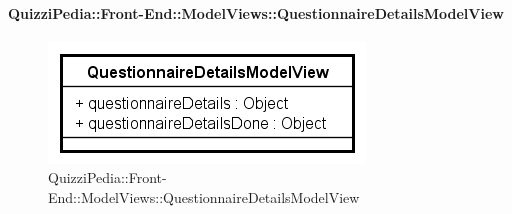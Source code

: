 \paragraph[QuizziPedia::Front-End::ModelViews\\::QuestionnaireDetailsModelView]{QuizziPedia::Front-End::ModelViews::QuestionnaireDetailsModelView}
	
	\label{QuizziPedia::Front-End::ModelViews::QuestionnaireDetailsModelView}
	
	\begin{figure}[ht]
		\centering
		\includegraphics[scale=0.5,keepaspectratio]{UML/Classi/Front-End/QuizziPedia_Front-end_ModelView_QuestionnaireDetailsModelView.png}
		\caption{QuizziPedia::Front-End::ModelViews::QuestionnaireDetailsModelView}
	\end{figure} \FloatBarrier
	
